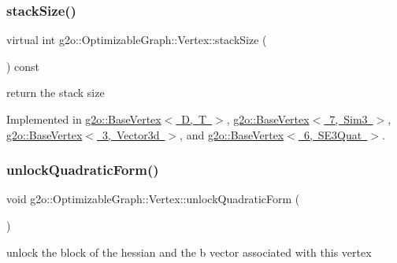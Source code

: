\subsubsection{\texorpdfstring{stack\+Size()}{stackSize()}}
{\footnotesize\ttfamily virtual int g2o\+::\+Optimizable\+Graph\+::\+Vertex\+::stack\+Size (\begin{DoxyParamCaption}{ }\end{DoxyParamCaption}) const\hspace{0.3cm}{\ttfamily [pure virtual]}}



return the stack size 



Implemented in \mbox{\hyperlink{classg2o_1_1_base_vertex_a7d82f4b9669dd123ac7d38c7f4345d8c}{g2o\+::\+Base\+Vertex$<$ D, T $>$}}, \mbox{\hyperlink{classg2o_1_1_base_vertex_a7d82f4b9669dd123ac7d38c7f4345d8c}{g2o\+::\+Base\+Vertex$<$ 7, Sim3 $>$}}, \mbox{\hyperlink{classg2o_1_1_base_vertex_a7d82f4b9669dd123ac7d38c7f4345d8c}{g2o\+::\+Base\+Vertex$<$ 3, Vector3d $>$}}, and \mbox{\hyperlink{classg2o_1_1_base_vertex_a7d82f4b9669dd123ac7d38c7f4345d8c}{g2o\+::\+Base\+Vertex$<$ 6, S\+E3\+Quat $>$}}.

\mbox{\label{classg2o_1_1_optimizable_graph_1_1_vertex_a5badd602625433ee1ce8e2aa7bb3b2ac}} 
\subsubsection{\texorpdfstring{unlock\+Quadratic\+Form()}{unlockQuadraticForm()}}
{\footnotesize\ttfamily void g2o\+::\+Optimizable\+Graph\+::\+Vertex\+::unlock\+Quadratic\+Form (\begin{DoxyParamCaption}{ }\end{DoxyParamCaption})\hspace{0.3cm}{\ttfamily [inline]}}

unlock the block of the hessian and the b vector associated with this vertex \mbox{\label{classg2o_1_1_optimizable_graph_1_1_vertex_ab5972c8ba6834c4dcb8a2319e9bf3070}} 
